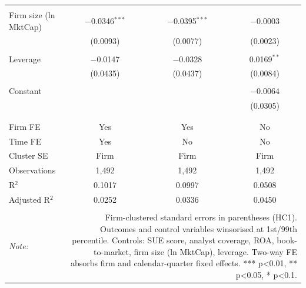 \begin{table}[!htbp]
\begin{tabular}{@{\extracolsep{5pt}}lccc}
  & & & \\ 
 Firm size (ln MktCap) & $-$0.0346$^{***}$ & $-$0.0395$^{***}$ & $-$0.0003 \\ 
  & (0.0093) & (0.0077) & (0.0023) \\ 
  & & & \\ 
 Leverage & $-$0.0147 & $-$0.0328 & 0.0169$^{**}$ \\ 
  & (0.0435) & (0.0437) & (0.0084) \\ 
  & & & \\ 
 Constant &  &  & $-$0.0064 \\ 
  &  &  & (0.0305) \\ 
  & & & \\ 
\hline \\[-1.8ex] 
Firm FE & Yes & Yes & No \\ 
Time FE & Yes & No & No \\ 
Cluster SE & Firm & Firm & Firm \\ 
Observations & 1,492 & 1,492 & 1,492 \\ 
R$^{2}$ & 0.1017 & 0.0997 & 0.0508 \\ 
Adjusted R$^{2}$ & 0.0252 & 0.0336 & 0.0450 \\ 
\hline 
\hline \\[-1.8ex] 
\textit{Note:}  & \multicolumn{3}{r}{Firm-clustered standard errors in parentheses (HC1). Outcomes and control variables winsorised at 1st/99th percentile. Controls: SUE score, analyst coverage, ROA, book-to-market, firm size (ln MktCap), leverage. Two-way FE absorbs firm and calendar-quarter fixed effects. *** p<0.01, ** p<0.05, * p<0.1.} \\ 
\end{tabular} 
\end{table} 

